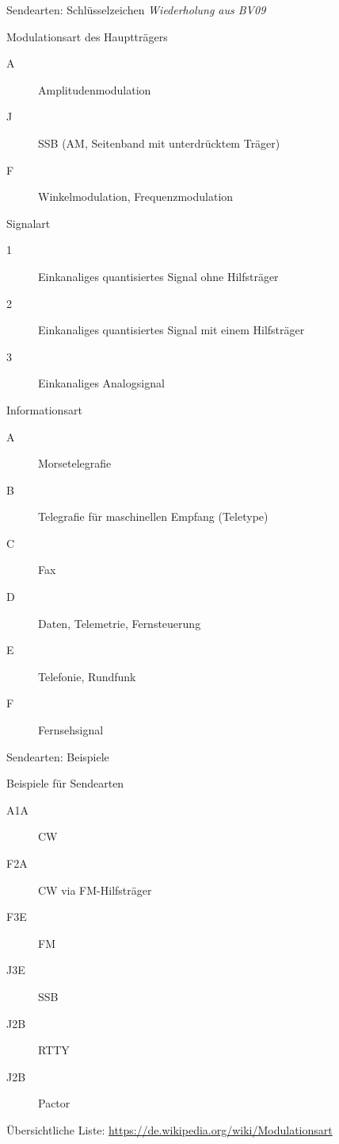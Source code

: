 \begin{frame}[allowframebreaks]{Sendearten: Schlüsselzeichen}
  \emph{Wiederholung aus BV09}

  \begin{block}{Modulationsart des Hauptträgers}
    \begin{description}
      \item[A] Amplitudenmodulation
      \item[J] SSB (AM, Seitenband mit unterdrücktem Träger)
      \item[F] Winkelmodulation, Frequenzmodulation
    \end{description}
  \end{block}

  \begin{block}{Signalart}
    \begin{description}
      \item[1] Einkanaliges quantisiertes Signal ohne Hilfsträger
      \item[2] Einkanaliges quantisiertes Signal mit einem Hilfsträger
      \item[3] Einkanaliges Analogsignal
    \end{description}
  \end{block}

  \begin{block}{Informationsart}
    \begin{description}
      \item[A] Morsetelegrafie
      \item[B] Telegrafie für maschinellen Empfang (Teletype)
      \item[C] Fax
      \item[D] Daten, Telemetrie, Fernsteuerung
      \item[E] Telefonie, Rundfunk
      \item[F] Fernsehsignal
    \end{description}
  \end{block}
\end{frame}

\begin{frame}{Sendearten: Beispiele}
  \begin{exampleblock}{Beispiele für Sendearten}
    \begin{description}
      \item[A1A] CW
      \item[F2A] CW via FM-Hilfsträger
      \item[F3E] FM
      \item[J3E] SSB
      \item[J2B] RTTY
      \item[J2B] Pactor
    \end{description}
  \end{exampleblock}

  Übersichtliche Liste: \url{https://de.wikipedia.org/wiki/Modulationsart}
\end{frame}

